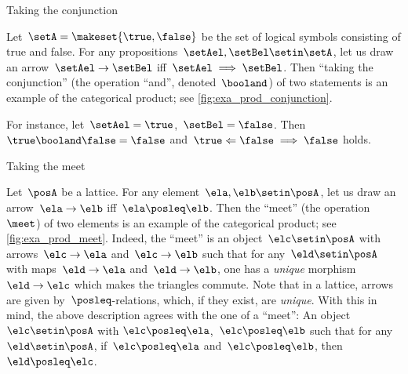 \begin{marginfigure}
    \centering
    \caption{Taking the conjunction}
    \label{fig:exa_prod_conjunction}
\end{marginfigure}

\begin{example}
    \label{exa:conjunction-as-prod}
    Let~$\setA = \makeset{ \true, \false }$ be the set of logical symbols consisting of true and false.
    For any propositions~$\setAel, \setBel  \setin \setA$, let us draw an arrow~$\setAel \to \setBel$ iff~$\setAel \implies \setBel$.
    Then ``taking the conjunction'' (the operation ``and'', denoted~$\booland$) of two statements is an example of the categorical product; see \cref{fig:exa_prod_conjunction}.

    For instance, let~$\setAel = \true$,~$\setBel = \false$.
    Then~$\true \booland \false = \false$ and~$\true \Leftarrow \false \implies \false$ holds.
\end{example}

\begin{marginfigure}
    \centering
    \caption{Taking the meet}
    \label{fig:exa_prod_meet}
\end{marginfigure}

\begin{example}
    \label{exa:meet-as-prod}
    Let~$\posA$ be a lattice.
    For any element~$\ela, \elb \setin \posA$, let us draw an arrow~$\ela \to \elb$ iff~$\ela \posleq \elb$.
    Then the ``meet'' (the operation~$\meet$) of two elements is an example of the categorical product; see \cref{fig:exa_prod_meet}.
    Indeed, the ``meet'' is an object~$\elc \setin \posA$ with arrows~$\elc\to \ela$ and~$\elc \to \elb$ such that for any~$\eld\setin \posA$ with maps~$\eld\to \ela$ and~$\eld\to \elb$, one has a \emph{unique} morphism~$\eld\to \elc$ which makes the triangles commute.
    Note that in a lattice, arrows are given by~$\posleq$-relations, which, if they exist, are \emph{unique}.
    With this in mind, the above description agrees with the one of a ``meet'':
    An object~$\elc\setin \posA$ with $\elc\posleq \ela$,~$\elc\posleq \elb$ such that for any~$\eld\setin \posA$, if~$\elc\posleq \ela$ and~$\elc\posleq \elb$, then~$\eld\posleq \elc$.
\end{example}

\begin{marginfigure}
    \centering
    \caption{}
    \label{fig:prod_generic}
\end{marginfigure}

